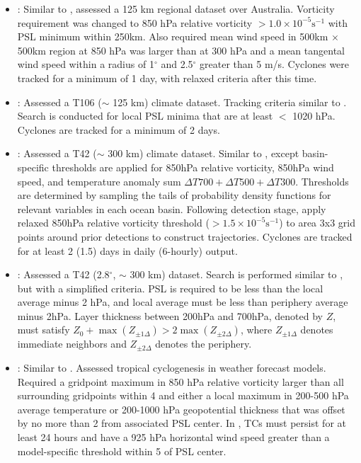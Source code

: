 \documentclass[gmdd, hvmath]{copernicus}
\begin{document}
\begin{itemize}
\item \cite{nguyen2001interannual}:  Similar to \cite{walsh1997tropical}, assessed a 125 km regional dataset over Australia.  Vorticity requirement was changed to 850 hPa relative vorticity $> 1.0 \times 10^{-5} \mbox{s}^{-1}$ with PSL minimum within 250km.  Also required mean wind speed in 500km $\times$ 500km region at 850 hPa was larger than at 300 hPa and a mean tangental wind speed within a radius of 1$^\circ$ and 2.5$^\circ$ greater than 5 m/s.  Cyclones were tracked for a minimum of 1 day, with relaxed criteria after this time.

\item \cite{sugi2002influence}:  Assessed a T106 ($\sim$ 125 km) climate dataset.  Tracking criteria similar to \cite{bengtsson1995hurricane}.  Search is conducted for local PSL minima that are at least $<$ 1020 hPa.  Cyclones are tracked for a minimum of 2 days.

\item \cite{camargo2002improving}:  Assessed a T42 ($\sim$ 300 km) climate dataset.  Similar to \cite{bengtsson1995hurricane, bengtsson1996will}, except basin-specific thresholds are applied for 850hPa relative vorticity, 850hPa wind speed, and temperature anomaly sum $\Delta T700+ \Delta T500+ \Delta T300$. Thresholds are determined by sampling the tails of probability density functions for relevant variables in each ocean basin. Following detection stage, apply relaxed 850hPa relative vorticity threshold ($> 1.5 \times 10^{-5} \mbox{s}^{-1}$) to area 3x3 grid points around prior detections to construct trajectories. Cyclones are tracked for at least 2 (1.5) days in daily (6-hourly) output. 

\item \cite{tsutsui2002implications}:  Assessed a T42 (2.8$^\circ$, $\sim$ 300 km) dataset.  Search is performed similar to \cite{tsutsui1996simulated}, but with a simplified criteria.  PSL is required to be less than the local average minus 2 hPa, and local average must be less than periphery average minus 2hPa.  Layer thickness between 200hPa and 700hPa, denoted by $Z$, must satisfy $Z_0 + \max(Z_{\pm 1 \Delta}) > 2 \max(Z_{\pm 2 \Delta})$, where $Z_{\pm 1 \Delta}$ denotes immediate neighbors and $Z_{\pm 2 \Delta}$ denotes the periphery.

\item \cite{cheung2002formation, halperin2013evaluation}: Similar to \citet{walsh1997objective}. Assessed tropical cyclogenesis in weather forecast models. Required a gridpoint maximum in 850 hPa relative vorticity larger than all surrounding gridpoints within 4\degree{} and either a local maximum in 200-500 hPa average temperature or 200-1000 hPa geopotential thickness that was offset by no more than 2\degree{} from associated PSL center. In \citet{halperin2013evaluation}, TCs must persist for at least 24 hours and have a 925 hPa horizontal wind speed greater than a model-specific threshold within 5\degree{} of PSL center.


\end{itemize}
\end{document}
